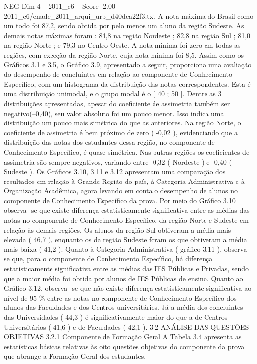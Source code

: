 \begin{textsample}{NEG Dim 4 – 2011\_c6 – Score -2.00 – 2011\_c6/enade\_2011\_arqui\_urb\_d40dca22f3.txt}
A nota máxima do Brasil como um todo foi 87,2, sendo obtida por pelo menos um aluno da região Sudeste.
As demais notas máximas foram : 84,8 na região Nordeste ; 82,8 na região Sul ; 81,0 na região Norte ; e 79,3 no Centro-Oeste.
A nota mínima foi zero em todas as regiões, com exceção da região Norte, cuja nota mínima foi 8,5.
Assim como os Gráficos 3.1 e 3.5, o Gráfico 3.9, apresentado a seguir, proporciona uma avaliação do desempenho de concluintes em relação ao componente de Conhecimento Específico, com um histograma da distribuição das notas correspondentes.
Esta é uma distribuição unimodal, e o grupo modal é o ( 40 ; 50 ].
Dentre as 3 distribuições apresentadas, apesar do coeficiente de assimetria também ser negativo(–0,40), seu valor absoluto foi um pouco menor.
Isso indica uma distribuição um pouco mais simétrica do que as anteriores.
Na região Norte, o coeficiente de assimetria é bem próximo de zero ( -0,02 ), evidenciando que a distribuição das notas dos estudantes dessa região, no componente de Conhecimento Específico, é quase simétrica.
Nas outras regiões os coeficientes de assimetria são sempre negativos, variando entre -0,32 ( Nordeste ) e -0,40 ( Sudeste ).
Os Gráficos 3.10, 3.11 e 3.12 apresentam uma comparação dos resultados em relação à Grande Região do país, à Categoria Administrativa e à Organização Acadêmica, agora levando em conta o desempenho de alunos no componente de Conhecimento Específico da prova.
Por meio do Gráfico 3.10 observa -se que existe diferença estatisticamente significativa entre as médias das notas no componente de Conhecimento Específico, da região Norte e Sudeste em relação às demais regiões.
Os alunos da região Sul obtiveram a média mais elevada ( 46,7 ), enquanto os da região Sudeste foram os que obtiveram a média mais baixa ( 41,2 ).
Quanto à Categoria Administrativa ( gráfico 3.11 ), observa -se que, para o componente de Conhecimento Específico, há diferença estatisticamente significativa entre as médias das IES Públicas e Privadas, sendo que a maior média foi obtida por alunos de IES Públicas de ensino.
Quanto ao Gráfico 3.12, observa -se que não existe diferença estatisticamente significativa ao nível de 95 \% entre as notas no componente de Conhecimento Específico dos alunos das Faculdades e dos Centros universitários.
Já a média dos concluintes das Universidades ( 44,3 ) é significativamente maior do que a de Centros Universitários ( 41,6 ) e de Faculdades ( 42,1 ). 3.2 ANÁLISE DAS QUESTÕES OBJETIVAS 3.2.1 Componente de Formação Geral A Tabela 3.4 apresenta as estatísticas básicas relativas às oito questões objetivas do componente da prova que abrange a Formação Geral dos estudantes.

\end{textsample}
